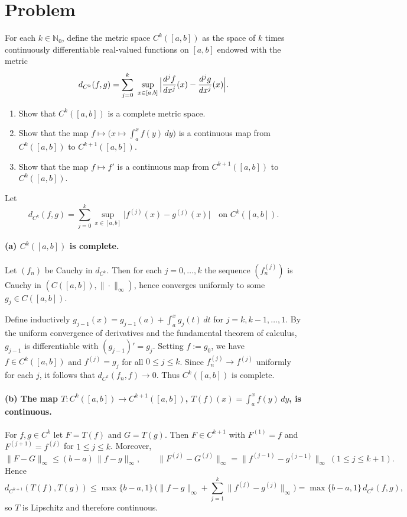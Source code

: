 \documentclass[12pt,a4paper]{article}
\begin{document}
\section*{Problem}
For each $k\in\mathbb{N}_0$, define the metric space $C^k([a,b])$ as the space of $k$ times continuously differentiable real-valued functions on $[a,b]$ endowed with the metric
\[
d_{C^k}(f,g)=\sum_{j=0}^{k}\ \sup_{x\in[a,b]}\,\Bigl|\frac{d^j f}{dx^j}(x)-\frac{d^j g}{dx^j}(x)\Bigr|.
\]
\begin{enumerate}[label=(\alph*)]
	\item Show that $C^k([a,b])$ is a complete metric space.
	\item Show that the map $f \mapsto \displaystyle\Big(x\mapsto \int_a^x f(y)\,dy\Big)$ is a continuous map from $C^k([a,b])$ to $C^{k+1}([a,b])$.
	\item Show that the map $f \mapsto f'$ is a continuous map from $C^{k+1}([a,b])$ to $C^k([a,b])$.
\end{enumerate}


Let
\[
d_{C^k}(f,g)=\sum_{j=0}^k \sup_{x\in[a,b]} \bigl| f^{(j)}(x)-g^{(j)}(x)\bigr|
\quad\text{on } C^k([a,b]).
\]

\paragraph{(a) $C^k([a,b])$ is complete.}
Let $(f_n)$ be Cauchy in $d_{C^k}$. Then for each $j=0,\dots,k$ the sequence
$(f_n^{(j)})$ is Cauchy in $(C([a,b]),\|\cdot\|_\infty)$, hence converges uniformly to some
$g_j\in C([a,b])$.

Define inductively $g_{j-1}(x)=g_{j-1}(a)+\int_a^x g_j(t)\,dt$ for $j=k,k-1,\dots,1$.
By the uniform convergence of derivatives and the fundamental theorem of calculus,
$g_{j-1}$ is differentiable with $(g_{j-1})'=g_j$. Setting $f:=g_0$, we have
$f\in C^k([a,b])$ and $f^{(j)}=g_j$ for all $0\le j\le k$. Since
$f_n^{(j)}\to f^{(j)}$ uniformly for each $j$, it follows that
$d_{C^k}(f_n,f)\to 0$. Thus $C^k([a,b])$ is complete.

\paragraph{(b) The map $T:C^k([a,b])\to C^{k+1}([a,b])$, $T(f)(x)=\int_a^x f(y)\,dy$, is continuous.}
For $f,g\in C^k$ let $F=T(f)$ and $G=T(g)$. Then $F\in C^{k+1}$ with
$F^{(1)}=f$ and $F^{(j+1)}=f^{(j)}$ for $1\le j\le k$. Moreover,
\[
\|F-G\|_\infty \le (b-a)\,\|f-g\|_\infty,\qquad
\|F^{(j)}-G^{(j)}\|_\infty = \|f^{(j-1)}-g^{(j-1)}\|_\infty\ (1\le j\le k+1).
\]
Hence
\[
d_{C^{k+1}}(T(f),T(g))
\le \max\{b-a,1\}\,\Big(\|f-g\|_\infty+\sum_{j=1}^k \|f^{(j)}-g^{(j)}\|_\infty\Big)
= \max\{b-a,1\}\, d_{C^k}(f,g),
\]
so $T$ is Lipschitz and therefore continuous.
\end{document}
